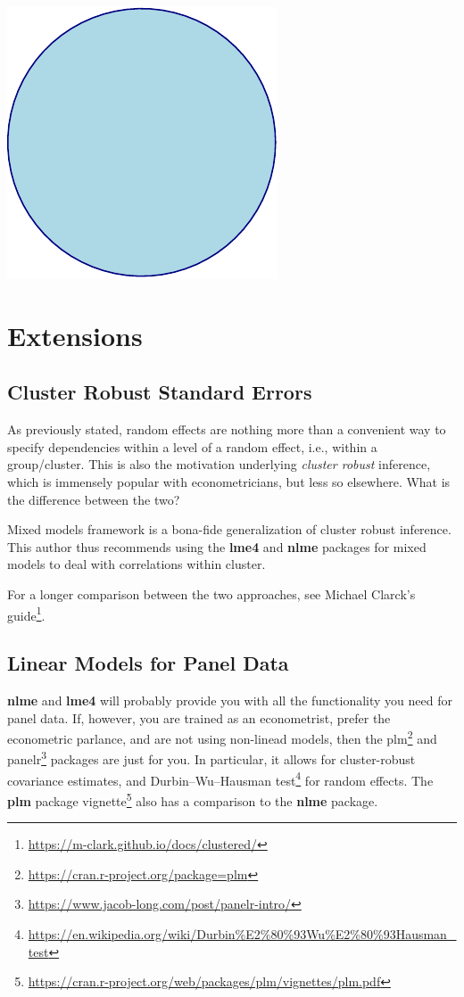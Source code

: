 \documentclass[]{book}
\renewcommand{\href}[2]{#2\footnote{\url{#1}}}
\theoremstyle{definition}
\theoremstyle{definition}
\theoremstyle{definition}
\theoremstyle{remark}
\begin{document}
\includegraphics[width=0.5\linewidth]{Rcourse_files/figure-latex/unnamed-chunk-218-1}

\hypertarget{extensions-1}{%
\section{Extensions}\label{extensions-1}}

\hypertarget{cr-se}{%
\subsection{Cluster Robust Standard Errors}\label{cr-se}}

As previously stated, random effects are nothing more than a convenient way to specify dependencies within a level of a random effect, i.e., within a group/cluster.
This is also the motivation underlying \emph{cluster robust} inference, which is immensely popular with econometricians, but less so elsewhere.
What is the difference between the two?

Mixed models framework is a bona-fide generalization of cluster robust inference.
This author thus recommends using the \textbf{lme4} and \textbf{nlme} packages for mixed models to deal with correlations within cluster.

For a longer comparison between the two approaches, see \href{https://m-clark.github.io/docs/clustered/}{Michael Clarck's guide}.

\hypertarget{linear-models-for-panel-data}{%
\subsection{Linear Models for Panel Data}\label{linear-models-for-panel-data}}

\textbf{nlme} and \textbf{lme4} will probably provide you with all the functionality you need for panel data.
If, however, you are trained as an econometrist, prefer the econometric parlance, and are not using non-linead models, then the \href{https://cran.r-project.org/package=plm}{plm} and \href{https://www.jacob-long.com/post/panelr-intro/}{panelr} packages are just for you.
In particular, it allows for cluster-robust covariance estimates, and \href{https://en.wikipedia.org/wiki/Durbin\%E2\%80\%93Wu\%E2\%80\%93Hausman_test}{Durbin--Wu--Hausman test} for random effects.
The \textbf{plm} \href{https://cran.r-project.org/web/packages/plm/vignettes/plm.pdf}{package vignette} also has a comparison to the \textbf{nlme} package.
\end{document}
